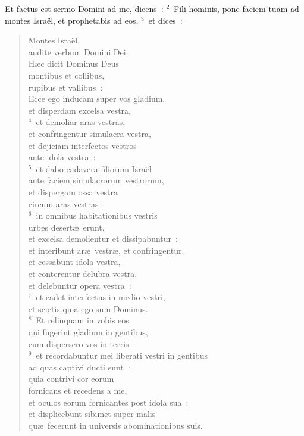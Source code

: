 \bchapter
\lettrine[lines=3,image=true,loversize=0.05,lraise=-0.03]{E}{}t factus est sermo Domini ad me, dicens~:
${}^{2}$~Fili hominis, pone faciem tuam ad montes Isra\"el, et prophetabis ad eos,
${}^{3}$~et dices~: \begin{flushleft}\begin{verse}Montes Isra\"el,\\ audite verbum Domini Dei.\\ H\ae c dicit Dominus Deus\\ montibus et collibus,\\ rupibus et vallibus~:\\ Ecce ego inducam super vos gladium,\\ et disperdam excelsa vestra,\\
${}^{4}$~et demoliar aras vestras,\\ et confringentur simulacra vestra,\\ et dejiciam interfectos vestros\\ ante idola vestra~:\\
${}^{5}$~et dabo cadavera filiorum Isra\"el\\ ante faciem simulacrorum vestrorum,\\ et dispergam ossa vestra\\ circum aras vestras~:\\
${}^{6}$~in omnibus habitationibus vestris\\ urbes desert\ae\ erunt,\\ et excelsa demolientur et dissipabuntur~:\\ et interibunt ar\ae\ vestr\ae , et confringentur,\\ et cessabunt idola vestra,\\ et conterentur delubra vestra,\\ et delebuntur opera vestra~:\\
${}^{7}$~et cadet interfectus in medio vestri,\\ et scietis quia ego sum Dominus.\\
${}^{8}$~Et relinquam in vobis eos\\ qui fugerint gladium in gentibus,\\ cum dispersero vos in terris~:\\
${}^{9}$~et recordabuntur mei liberati vestri in gentibus\\ ad quas captivi ducti sunt~:\\ quia contrivi cor eorum\\ fornicans et recedens a me,\\ et oculos eorum fornicantes post idola sua~:\\ et displicebunt sibimet super malis\\ qu\ae\ fecerunt in universis abominationibus suis.\\

\end{verse}
\end{flushleft}
